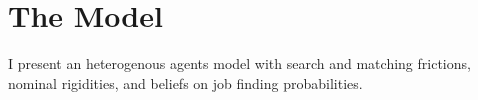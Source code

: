 \documentclass[titlepage]{\econtex}\providecommand{\texname}{Dissertation-Proposal}
\providecommand{\FigDir}{Figures}
\begin{document}





\hypertarget{The-Model}{}
\section{The Model}

I present an heterogenous agents model with search and matching frictions, nominal rigidities, and beliefs on job finding probabilities.
\end{document}
